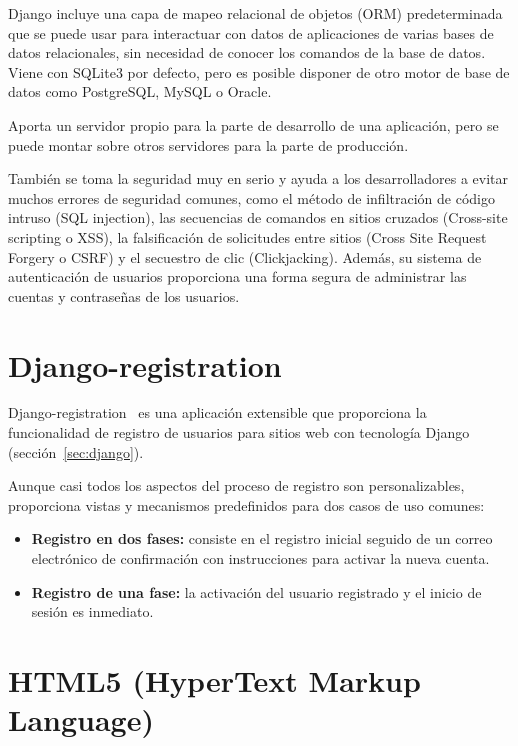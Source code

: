 \documentclass[a4paper, 12pt]{book}
\begin{document}
Django incluye una capa de mapeo relacional de objetos (ORM) predeterminada que se puede usar para interactuar con datos de aplicaciones de varias bases de datos relacionales, sin necesidad de conocer los comandos de la base de datos.
Viene con SQLite3 por defecto, pero es posible disponer de otro motor de base de datos como PostgreSQL, MySQL o Oracle.

\vspace{5mm}
Aporta un servidor propio para la parte de desarrollo de una aplicación, pero se puede montar sobre otros servidores para la parte de producción.

\vspace{5mm}
También se toma la seguridad muy en serio y ayuda a los desarrolladores a evitar muchos errores de seguridad comunes, como el método de infiltración de código intruso (SQL injection), las secuencias de comandos en sitios cruzados (Cross-site scripting o XSS), la falsificación de solicitudes entre sitios (Cross Site Request Forgery o CSRF) y el secuestro de clic (Clickjacking).
Además, su sistema de autenticación de usuarios proporciona una forma segura de administrar las cuentas y contraseñas de los usuarios.


\section{Django-registration} 
\label{sec:django-registration}

Django-registration~\cite{Bennett01:django-registration} es una aplicación extensible que proporciona la funcionalidad de registro de usuarios para sitios web con tecnología Django (sección~\ref{sec:django}).

\vspace{5mm}
Aunque casi todos los aspectos del proceso de registro son personalizables, proporciona vistas y mecanismos predefinidos para dos casos de uso comunes:

\begin{itemize}
    \item \textbf{Registro en dos fases:} consiste en el registro inicial seguido de un correo electrónico de confirmación con instrucciones para activar la nueva cuenta.
    \item \textbf{Registro de una fase:} la activación del usuario registrado y el inicio de sesión es inmediato.
\end{itemize}


\section{HTML5 (HyperText Markup Language)} 
\label{sec:html5}
\end{document}
